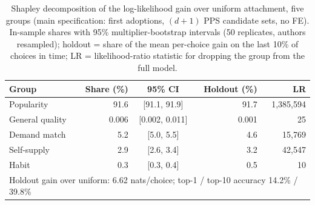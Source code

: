 \begin{table}[htbp]
\centering
\caption{Shapley decomposition of the log-likelihood gain over uniform attachment, five groups (main specification: first adoptions, $(d{+}1)$ PPS candidate sets, no FE). In-sample shares with 95\% multiplier-bootstrap intervals (50 replicates, authors resampled); holdout = share of the mean per-choice gain on the last 10\% of choices in time; LR = likelihood-ratio statistic for dropping the group from the full model.}
\label{tab:shapley5}
\small
\begin{tabular}{lrcrr}
\toprule
Group & Share (\%) & 95\% CI & Holdout (\%) & LR \\
\midrule
Popularity & 91.6 & [91.1, 91.9] & 91.7 & 1,385,594 \\
General quality & 0.006 & [0.002, 0.011] & 0.001 & 25 \\
Demand match & 5.2 & [5.0, 5.5] & 4.6 & 15,769 \\
Self-supply & 2.9 & [2.6, 3.4] & 3.2 & 42,547 \\
Habit & 0.3 & [0.3, 0.4] & 0.5 & 10 \\
\midrule
\multicolumn{5}{l}{Holdout gain over uniform: 6.62 nats/choice; top-1 / top-10 accuracy 14.2\% / 39.8\%} \\
\bottomrule
\end{tabular}
\end{table}
